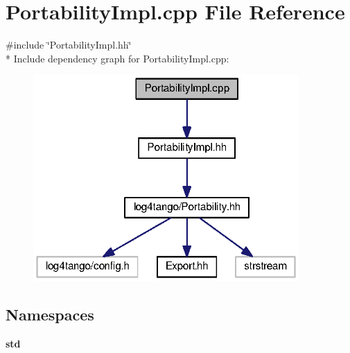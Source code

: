 \section{Portability\-Impl.\-cpp File Reference}
\label{PortabilityImpl_8cpp}
{\ttfamily \#include \char`\"{}Portability\-Impl.\-hh\char`\"{}}\\*
Include dependency graph for Portability\-Impl.\-cpp\-:
\nopagebreak
\begin{figure}[H]
\begin{center}
\leavevmode
\includegraphics[width=287pt]{d0/d46/PortabilityImpl_8cpp__incl}
\end{center}
\end{figure}
\subsection*{Namespaces}
\begin{DoxyCompactItemize}
\item 
{\bf std}
\end{DoxyCompactItemize}
